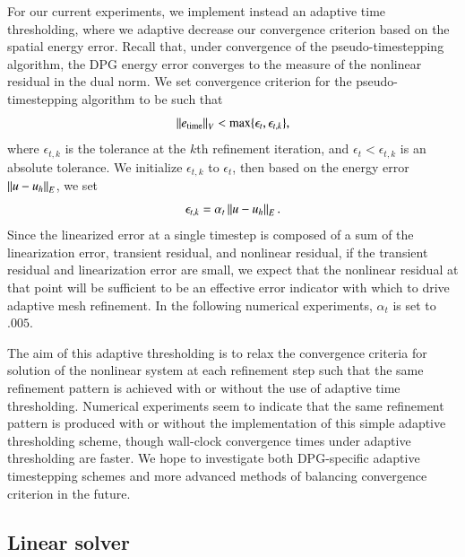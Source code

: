 For our current experiments, we implement instead an adaptive time thresholding, where we adaptive decrease our convergence criterion based on the spatial energy error.  Recall that, under convergence of the pseudo-timestepping algorithm, the DPG energy error converges to the measure of the nonlinear residual in the dual norm.  We set convergence criterion for the pseudo-timestepping algorithm to be such that 
\[
\nor{e_{\rm time}}_V < \max \{\epsilon_t,\epsilon_{t,k}\},
\]
where $\epsilon_{t,k}$ is the tolerance at the $k$th refinement iteration, and $\epsilon_t < \epsilon_{t,k}$ is an absolute tolerance.  We initialize $\epsilon_{t,k}$ to $\epsilon_{t}$, then based on the energy error $\nor{u-u_h}_E$, we set 
\[
\epsilon_{t,k} = \alpha_t \nor{u-u_h}_E.
\]
Since the linearized error at a single timestep is composed of a sum of the linearization error, transient residual, and nonlinear residual, if the transient residual and linearization error are small, we expect that the nonlinear residual at that point will be sufficient to be an effective error indicator with which to drive adaptive mesh refinement.  In the following numerical experiments, $\alpha_t$ is set to $.005$.  

The aim of this adaptive thresholding is to relax the convergence criteria for solution of the nonlinear system at each refinement step such that the same refinement pattern is achieved with or without the use of adaptive time thresholding.  Numerical experiments seem to indicate that the same refinement pattern is produced with or without the implementation of this simple adaptive thresholding scheme, though wall-clock convergence times under adaptive thresholding are faster.  We hope to investigate both DPG-specific adaptive timestepping schemes and more advanced methods of balancing convergence criterion in the future.  

\subsection{Linear solver}

